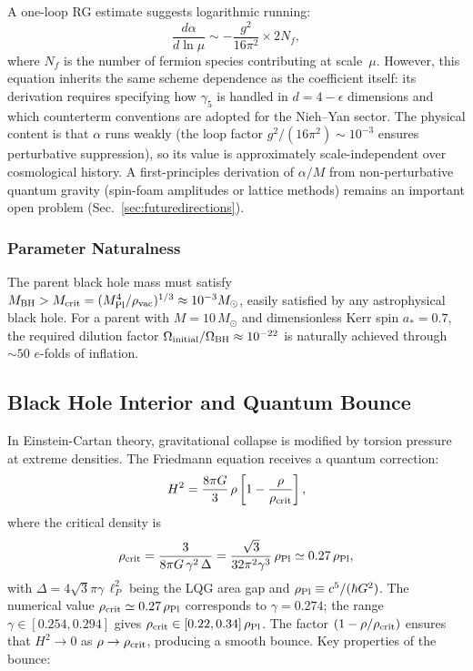 \documentclass[aps,prd,twocolumn,superscriptaddress,showpacs,preprintnumbers,nofootinbib,longbibliography,floatfix]{revtex4-2}
\newcommand{\rhocrit}{\rho_{\rm crit}}
\newcommand{\rhoPl}{\rho_{\rm Pl}}
\begin{document}
A one-loop RG estimate suggests logarithmic running:
\begin{equation}\label{eq:RGflow}
\frac{d\alpha}{d\ln\mu} \sim -\frac{g^2}{16\pi^2}\times 2N_f,
\end{equation}
where $N_f$ is the number of fermion species contributing at scale~$\mu$. However, this equation inherits the same scheme dependence as the coefficient itself: its derivation requires specifying how $\gamma_5$ is handled in $d=4-\epsilon$ dimensions and which counterterm conventions are adopted for the Nieh--Yan sector. The physical content is that $\alpha$ runs weakly (the loop factor $g^2/(16\pi^2)\sim 10^{-3}$ ensures perturbative suppression), so its value is approximately scale-independent over cosmological history. A first-principles derivation of $\alpha/M$ from non-perturbative quantum gravity (spin-foam amplitudes or lattice methods) remains an important open problem (Sec.~\ref{sec:futuredirections}).


\subsubsection{Parameter Naturalness}\label{sec:naturalness}

The parent black hole mass must satisfy $M_{\rm BH} > M_{\rm crit} = (M_{\rm Pl}^4/\rho_{\rm vac})^{1/3}\approx 10^{-3}M_\odot$, easily satisfied by any astrophysical black hole. For a parent with $M=10\,M_\odot$ and dimensionless Kerr spin $a_*=0.7$, the required dilution factor $\Omega_{\rm initial}/\Omega_{\rm BH}\approx 10^{-22}$ is naturally achieved through $\sim 50$ $e$-folds of inflation.


\subsection{Black Hole Interior and Quantum Bounce}\label{sec:bounce}

In Einstein-Cartan theory, gravitational collapse is modified by torsion pressure at extreme densities. The Friedmann equation receives a quantum correction:
\begin{equation}\label{eq:modfriedmann}
H^2 = \frac{8\pi G}{3}\,\rho\left[1-\frac{\rho}{\rhocrit}\right],
\end{equation}
where the critical density is
\begin{equation}\label{eq:rhocrit}
\rhocrit = \frac{3}{8\pi G\,\gamma^2\,\Delta} = \frac{\sqrt{3}}{32\pi^2\gamma^3}\,\rhoPl \simeq 0.27\,\rhoPl,
\end{equation}
with $\Delta = 4\sqrt{3}\pi\gamma\,\ell_P^2$ being the LQG area gap and $\rhoPl\equiv c^5/(\hbar G^2)$. The numerical value $\rhocrit\simeq 0.27\,\rhoPl$ corresponds to $\gamma = 0.274$; the range $\gamma\in[0.254,0.294]$ gives $\rhocrit\in[0.22,0.34]\,\rhoPl$. The factor $(1-\rho/\rhocrit)$ ensures that $H^2 \to 0$ as $\rho \to \rhocrit$, producing a smooth bounce. Key properties of the bounce:
\end{document}

